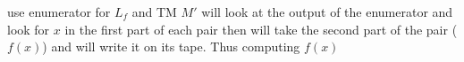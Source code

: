 use enumerator for $L_f$
and TM $M'$ will look at the output of the enumerator and look for $x$ in the first part of each pair
then will take the second part of the pair ($f(x)$) and will write it on its tape. Thus computing $f(x)$

